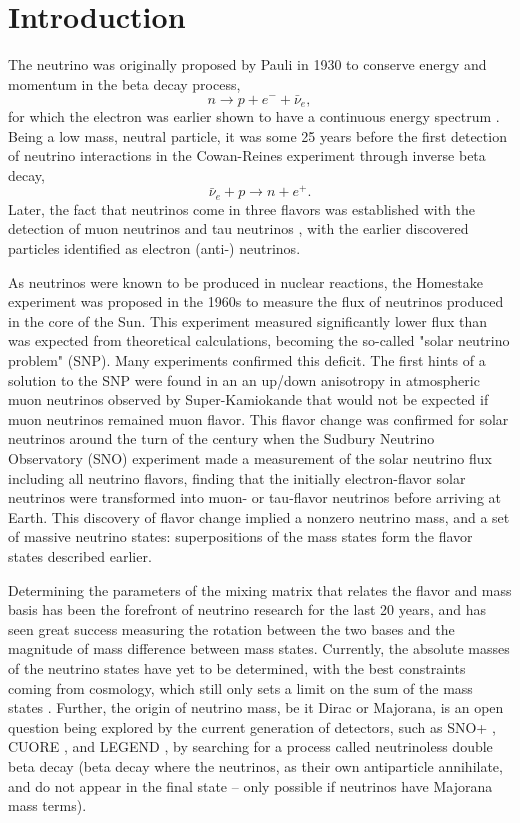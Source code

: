 \chapter{Introduction}
The neutrino was originally proposed by Pauli in 1930 \cite{pauli} to conserve energy and momentum in the beta decay process,
\begin{equation}
n \rightarrow p + e^- + \bar{\nu}_e,
\end{equation}
for which the electron was earlier shown to have a continuous energy spectrum \cite{chadwick}.
Being a low mass, neutral particle, it was some 25 years before the first detection of neutrino interactions in the Cowan-Reines experiment \cite{cowan-reines} through inverse beta decay,
\begin{equation}
\bar{\nu}_e + p \rightarrow n + e^+.
\end{equation}
Later, the fact that neutrinos come in three flavors was established with the detection of muon neutrinos \cite{danby} and tau neutrinos \cite{donut}, with the earlier discovered particles identified as electron (anti-) neutrinos.

As neutrinos were known to be produced in nuclear reactions, the Homestake experiment \cite{homestake} was proposed in the 1960s to measure the flux of neutrinos produced in the core of the Sun.
This experiment measured significantly lower flux than was expected from theoretical calculations, becoming the so-called "solar neutrino problem" (SNP).
Many experiments \cite{sage,gallex,gno} confirmed this deficit.
The first hints of a solution to the SNP were found in an an up/down anisotropy in atmospheric muon neutrinos observed by Super-Kamiokande \cite{superk} that would not be expected if muon neutrinos remained muon flavor. 
This flavor change was confirmed for solar neutrinos around the turn of the century when the Sudbury Neutrino Observatory (SNO) experiment \cite{3phase} made a measurement of the solar neutrino flux including all neutrino flavors, finding that the initially electron-flavor solar neutrinos were transformed into muon- or tau-flavor neutrinos before arriving at Earth.
This discovery of flavor change implied a nonzero neutrino mass, and a set of massive neutrino states: superpositions of the mass states form the flavor states described earlier.

Determining the parameters of the mixing matrix that relates the flavor and mass basis has been the forefront of neutrino research for the last 20 years, and has seen great success measuring the rotation between the two bases and the magnitude of mass difference between mass states. 
Currently, the absolute masses of the neutrino states have yet to be determined, with the best constraints coming from cosmology, which still only sets a limit on the sum of the mass states \cite{pdg}.
Further, the origin of neutrino mass, be it Dirac or Majorana, is an open question being explored by the current generation of detectors, such as SNO+ \cite{snop}, CUORE \cite{cuore}, and LEGEND \cite{legend}, by searching for a process called neutrinoless double beta decay (beta decay where the neutrinos, as their own antiparticle annihilate, and do not appear in the final state -- only possible if neutrinos have Majorana mass terms).

